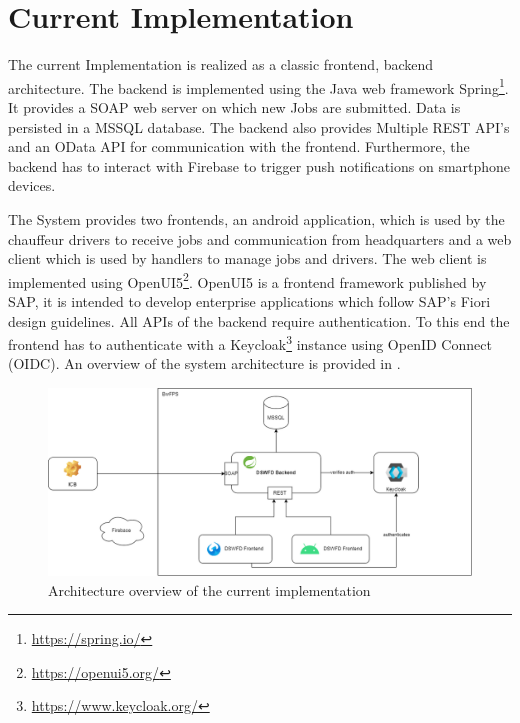 \section{Current Implementation}


The current Implementation is realized as a classic frontend, backend architecture. The backend is implemented using the Java web framework Spring\footnote{\url{https://spring.io/}}. It provides a SOAP web server on which new Jobs are submitted. Data is persisted in a MSSQL database. The backend also provides Multiple REST API's and an OData API for communication with the frontend. Furthermore, the backend has to interact with Firebase to trigger push notifications on smartphone devices.

The System provides two frontends, an android application, which is used by the chauffeur drivers to receive jobs and communication from headquarters and a web client which is used by handlers to manage jobs and drivers. The web client is implemented using OpenUI5\footnote{\url{https://openui5.org/}}. OpenUI5 is a frontend framework published by SAP, it is intended to develop enterprise applications which follow SAP's Fiori design guidelines. All APIs of the backend require authentication. To this end the frontend has to authenticate with a Keycloak\footnote{\url{https://www.keycloak.org/}} instance using OpenID Connect (OIDC). An overview of the system architecture is provided in .

\begin{figure}[ht]
    \centering
    \includegraphics[width=.8\linewidth]{assets/dswfd-architecture}
    \caption{Architecture overview of the current implementation}
    \label{fig:dswfd-architecture}
\end{figure}

